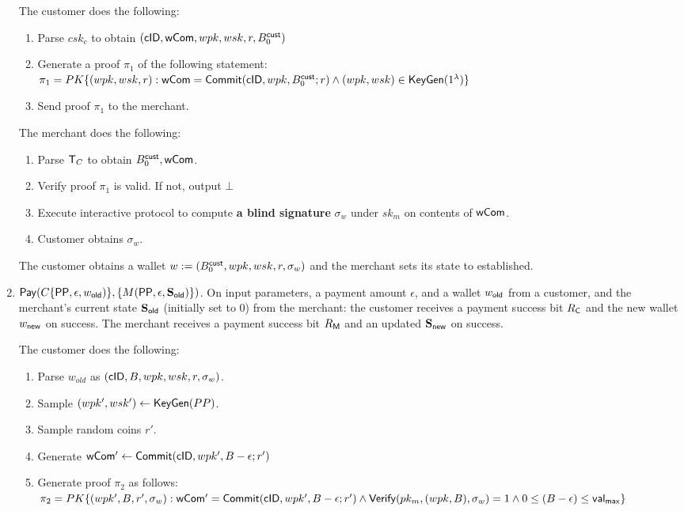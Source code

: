 \documentclass[11pt]{report}
\newcommand{\BC}{B^{\text{\sf cust}}_{\text{0}}}
\begin{document}
\begin{enumerate}
\medskip \noindent
The customer does the following:
\begin{enumerate}
\item Parse $csk_c$ to obtain $({\sf cID}, {\sf wCom}, wpk, wsk, r, \BC)$
\item Generate a proof $\pi_1$ of the following statement: \\
$\pi_1 = PK\{ (wpk, wsk, r) : {\sf wCom} = {\sf Commit}({\sf cID}, wpk, \BC; r) \wedge (wpk, wsk) \in {\sf KeyGen}(1^\lambda)\}$
\item Send proof $\pi_1$ to the merchant.
\end{enumerate}

\medskip \noindent
The merchant does the following:
\begin{enumerate}
\item Parse ${\sf T}_{C}$ to obtain $\BC, {\sf wCom}$.
\item Verify proof $\pi_1$ is valid. If not, output $\bot$
\item Execute interactive protocol to compute {\bf a blind signature} $\sigma_w$ under $sk_m$ on contents of ${\sf wCom}$.
\item Customer obtains $\sigma_w$.
\end{enumerate}

\medskip \noindent
The customer obtains a wallet $w := (\BC, wpk, wsk, r, \sigma_w)$ and the merchant sets its state to {\sf established}.


\item ${\sf Pay}( C\{{\sf PP}, \epsilon, w_{\sf old})\}, \{M({\sf PP}, \epsilon, {\bf S}_{\sf old})\})$. On input parameters, a payment amount $\epsilon$, and a wallet $w_{\sf old}$ from a customer, and the merchant's current state ${\bf S}_{\sf old}$ (initially set to $0$) from the merchant: the customer receives a payment success bit $R_{\sf C}$ and the new wallet $w_{\sf new}$ on success. The merchant receives a payment success bit $R_{\sf M}$ and an updated ${\bf S}_{\sf new}$ on success.

\medskip \noindent
The customer does the following:
\begin{enumerate}
\item Parse $w_{old}$ as $({\sf cID}, B, wpk, wsk, r, \sigma_w)$.
\item Sample $(wpk', wsk') \leftarrow {\sf KeyGen}(PP)$.
\item Sample random coins $r'$.
\item Generate ${\sf wCom'} \leftarrow {\sf Commit}({\sf cID}, wpk', B - \epsilon; r')$
\item Generate proof $\pi_2$ as follows:
\\ $\pi_2 = PK\{ (wpk', B, r', \sigma_w) : {\sf wCom'} = {\sf Commit}({\sf cID}, wpk', B - \epsilon; r') 
\\ \wedge {\sf Verify}(pk_m, (wpk, B), \sigma_w) = 1
\\ \wedge 0 \leq (B - \epsilon) \leq {\sf val}_{\sf max} \}$


\end{enumerate}
\end{enumerate}
\end{document}

